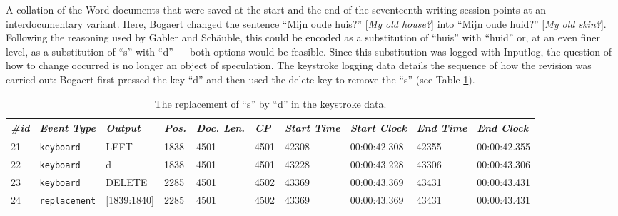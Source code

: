 \begin{paper}
A collation of the Word documents that were saved at the start and the
end of the seventeenth writing session points at an interdocumentary
variant. Here, Bogaert changed the sentence ``Mijn oude huis?'' [\emph{My
old house?}] into ``Mijn oude huid?'' [\emph{My old skin?}]. Following the
reasoning used by Gabler and Schäuble, this could be encoded as a
substitution of ``huis'' with ``huid'' or, at an even finer level, as a
substitution of ``s'' with ``d'' --- both options would be feasible. Since
this substitution was logged with Inputlog, the question of how to
change occurred is no longer an object of speculation. The keystroke
logging data details the sequence of how the revision was carried out:
Bogaert first pressed the key ``d'' and then used the delete key to
remove the ``s'' (see Table \ref{tab:bekius:replacement1}).

\newpage
\renewcommand*{\thefootnote}{\fnsymbol{footnote}}

\begin{table}[H]
\centering\tiny\renewcommand{\arraystretch}{1.5}
\caption[The replacement of ``s'' by ``d'' in the
keystroke data.]{The replacement of ``s'' by ``d'' in the
keystroke data.\footnotemark[2]}
\label{tab:bekius:replacement1}
\begin{tabular}{p{}p{}|p{}|p{}p{}p{}p{}p{}p{}p{}}
\toprule
\textit{\#id} & \textit{Event Type} & \textit{Output} & \textit{Pos.} & \textit{Doc. Len}. & \textit{CP} & \textit{Start Time} & \textit{Start Clock} & \textit{End Time }& \textit{End Clock}\tabularnewline
\midrule
21	& \verb|keyboard|	& LEFT	& 1838	& 4501	& 4501	& 42308	& 00:00:42.308	& 42355	& 00:00:42.355\tabularnewline

22	& \verb|keyboard|	& d	& 1838	& 4501	& 4501	& 43228	& 00:00:43.228	& 43306	& 00:00:43.306\tabularnewline

23	& \verb|keyboard|	& DELETE	& 2285	& 4501	& 4502	& 43369	& 00:00:43.369	& 43431	& 00:00:43.431\tabularnewline

24	& \verb|replacement|	& [1839:1840]	& 2285	& 4501	& 4502	& 43369	& 00:00:43.369	& 43431	& 00:00:43.431\tabularnewline


\end{tabular}
\end{table}
\end{paper}

